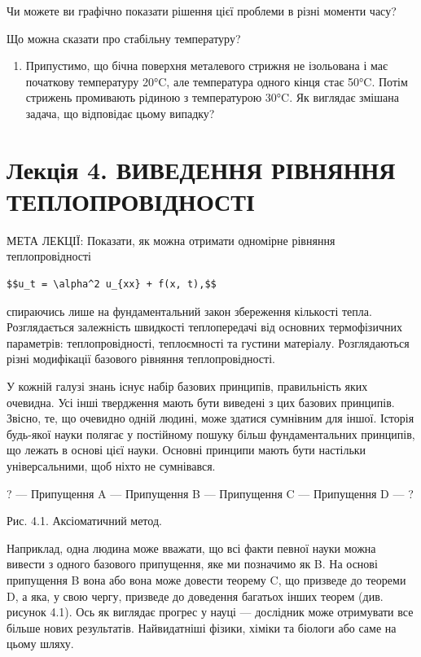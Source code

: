 \documentclass[
  ukrainian,
]{article}
\providecommand{\tightlist}{%
  \setlength{\itemsep}{0pt}\setlength{\parskip}{0pt}}
\begin{document}
Чи можете ви графічно показати рішення цієї проблеми в різні моменти
часу?

Що можна сказати про стабільну температуру?

\begin{enumerate}
\def\labelenumi{\arabic{enumi}.}
\setcounter{enumi}{3}
\tightlist
\item
  Припустимо, що бічна поверхня металевого стрижня не ізольована і має
  початкову температуру 20°C, але температура одного кінця стає 50°C.
  Потім стрижень промивають рідиною з температурою 30°C. Як виглядає
  змішана задача, що відповідає цьому випадку?
\end{enumerate}

\section{Лекція 4. ВИВЕДЕННЯ РІВНЯННЯ
ТЕПЛОПРОВІДНОСТІ}\label{ux43bux435ux43aux446ux456ux44f-4.-ux432ux438ux432ux435ux434ux435ux43dux43dux44f-ux440ux456ux432ux43dux44fux43dux43dux44f-ux442ux435ux43fux43bux43eux43fux440ux43eux432ux456ux434ux43dux43eux441ux442ux456}

МЕТА ЛЕКЦІЇ: Показати, як можна отримати одномірне рівняння
теплопровідності

\begin{verbatim}
$$u_t = \alpha^2 u_{xx} + f(x, t),$$
\end{verbatim}

спираючись лише на фундаментальний закон збереження кількості тепла.
Розглядається залежність швидкості теплопередачі від основних
термофізичних параметрів: теплопровідності, теплоємності та густини
матеріалу. Розглядаються різні модифікації базового рівняння
теплопровідності.

У кожній галузі знань існує набір базових принципів, правильність яких
очевидна. Усі інші твердження мають бути виведені з цих базових
принципів. Звісно, те, що очевидно одній людині, може здатися сумнівним
для іншої. Історія будь-якої науки полягає у постійному пошуку більш
фундаментальних принципів, що лежать в основі цієї науки. Основні
принципи мають бути настільки універсальними, щоб ніхто не сумнівався.

? --- Припущення A --- Припущення B --- Припущення C --- Припущення D
--- ?

Рис. 4.1. Аксіоматичний метод.

Наприклад, одна людина може вважати, що всі факти певної науки можна
вивести з одного базового припущення, яке ми позначимо як B. На основі
припущення B вона або вона може довести теорему C, що призведе до
теореми D, а яка, у свою чергу, призведе до доведення багатьох інших
теорем (див. рисунок 4.1). Ось як виглядає прогрес у науці --- дослідник
може отримувати все більше нових результатів. Найвидатніші фізики,
хіміки та біологи або саме на цьому шляху.
\end{document}
